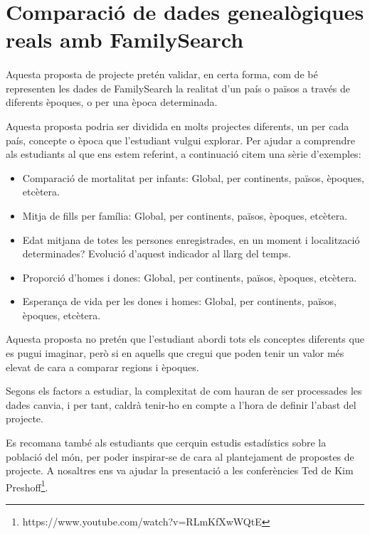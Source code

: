 \section{Comparació de dades genealògiques reals amb FamilySearch}

    \paragraph{}
    Aquesta proposta de projecte pretén validar, en certa forma, com de bé representen les dades de FamilySearch la realitat d'un país o països a través de diferents èpoques, o per una època determinada.

    Aquesta proposta podria ser dividida en molts projectes diferents, un per cada país, concepte o època que l'estudiant vulgui explorar. Per ajudar a comprendre als estudiants al que ens estem referint, a continuació citem una sèrie d'exemples:

    \begin{itemize}
        \item Comparació de mortalitat per infants: Global, per continents, països, èpoques, etcètera.
        \item Mitja de fills per família: Global, per continents, països, èpoques, etcètera.
        \item Edat mitjana de totes les persones enregistrades, en un moment i localització determinades? Evolució d'aquest indicador al llarg del temps.
        \item Proporció d'homes i dones: Global, per continents, països, èpoques, etcètera.
        \item Esperança de vida per les dones i homes: Global, per continents, països, èpoques, etcètera.
    \end{itemize}

    Aquesta proposta no pretén que l'estudiant abordi tots els conceptes diferents que es pugui imaginar, però si en aquells que cregui que poden tenir un valor més elevat de cara a comparar regions i èpoques.

    Segons els factors a estudiar, la complexitat de com hauran de ser processades les dades canvia, i per tant, caldrà tenir-ho en compte a l'hora de definir l'abast del projecte.

    Es recomana també als estudiants que cerquin estudis estadístics sobre la població del món, per poder inspirar-se de cara al plantejament de propostes de projecte. A nosaltres ens va ajudar la presentació a les conferències Ted de Kim Preshoff\footnote{https://www.youtube.com/watch?v=RLmKfXwWQtE}.
